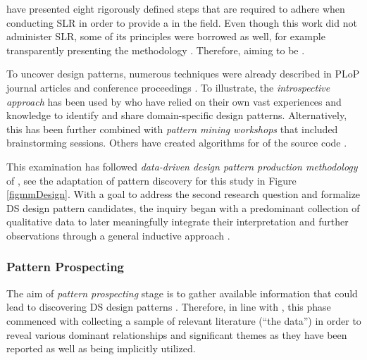 \textcite{Okoli2010} have presented eight rigorously defined steps that are required to adhere when conducting \ac{SLR} in order to provide a  in the field. 
Even though this work did not administer \ac{SLR}, some of its principles were borrowed as well, for example transparently presenting the methodology \parencites{Hajimia2014}{JAN:JAN623}.
Therefore, aiming to be  \parencite[1]{Okoli2010}. 

To uncover design patterns, numerous techniques were already described in \ac{PLoP} journal articles and conference proceedings \parencite{InventadoPeter2015}.
To illustrate, the \emph{introspective approach} has been used by \textcite{MinerDonald2012} who have relied on their own vast experiences and knowledge to identify and share domain-specific design patterns.
Alternatively, this has been further combined with \emph{pattern mining workshops} that included brainstorming sessions.
Others have created algorithms for  of the source code \parencite{GoFDesignPatternsAmpatzoglou2013}.

This examination has followed \emph{data-driven design pattern production methodology} of \textcite{InventadoPeter2015}, see the adaptation of pattern discovery for this study in Figure \ref{figmmDesign}.
With a goal to address the second research question and formalize \ac{DS} design pattern candidates, the inquiry began with a predominant collection of qualitative data to later meaningfully integrate their interpretation and further observations through a general inductive approach \parencites{InventadoPeter2015}{t06}.

\subsubsection{Pattern Prospecting} 
\label{pprospecting}
The aim of \emph{pattern prospecting} stage is to gather available information that could lead to discovering \ac{DS} design patterns \parencite{InventadoPeter2015}.
Therefore, in line with \textcites{Stefan2017}, this phase commenced with collecting a sample of relevant literature (\enquote{the data}) in order to reveal various dominant relationships and significant themes as they have been reported as well as being implicitly utilized.

